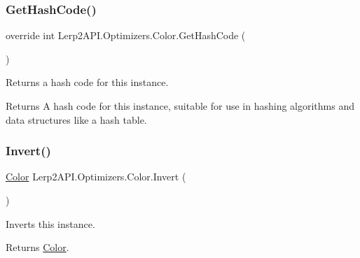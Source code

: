 \subsubsection{\texorpdfstring{Get\+Hash\+Code()}{GetHashCode()}}
{\footnotesize\ttfamily override int Lerp2\+A\+P\+I.\+Optimizers.\+Color.\+Get\+Hash\+Code (\begin{DoxyParamCaption}{ }\end{DoxyParamCaption})\hspace{0.3cm}{\ttfamily [inline]}}



Returns a hash code for this instance. 

\begin{DoxyReturn}{Returns}
A hash code for this instance, suitable for use in hashing algorithms and data structures like a hash table.
\end{DoxyReturn}
\mbox{\label{struct_lerp2_a_p_i_1_1_optimizers_1_1_color_a20f2915a5d0b55c84d5ef18e9253ae6b}} 
\subsubsection{\texorpdfstring{Invert()}{Invert()}}
{\footnotesize\ttfamily \hyperlink{struct_lerp2_a_p_i_1_1_optimizers_1_1_color}{Color} Lerp2\+A\+P\+I.\+Optimizers.\+Color.\+Invert (\begin{DoxyParamCaption}{ }\end{DoxyParamCaption})\hspace{0.3cm}{\ttfamily [inline]}}



Inverts this instance. 

\begin{DoxyReturn}{Returns}
\hyperlink{struct_lerp2_a_p_i_1_1_optimizers_1_1_color}{Color}.
\end{DoxyReturn}
\mbox{\label{struct_lerp2_a_p_i_1_1_optimizers_1_1_color_aabc594bf2cd7ca79d786768a872038f2}} 
